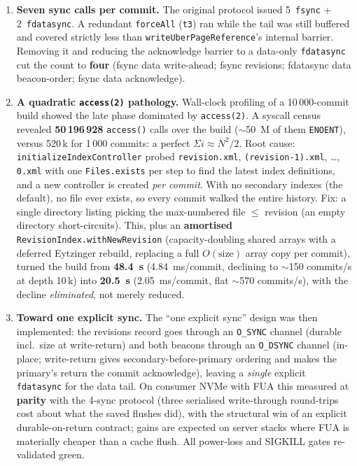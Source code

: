 \documentclass[11pt,a4paper,oneside]{report}
\theoremstyle{sirixthm}
\newcommand{\code}[1]{\texttt{#1}}
\begin{document}
\begin{enumerate}[label=\arabic*.,leftmargin=2em]
\item \textbf{Seven sync calls per commit.} The original protocol issued 5~\code{fsync} {+}
  2~\code{fdatasync}. A redundant \code{forceAll} (\code{t3}) ran while the tail was still
  buffered and covered strictly less than \code{writeUberPageReference}'s internal barrier.
  Removing it and reducing the acknowledge barrier to a data-only \code{fdatasync} cut the
  count to \textbf{four} (fsync data write-ahead; fsync revisions; fdatasync data
  beacon-order; fsync data acknowledge).
\item \textbf{A quadratic \code{access(2)} pathology.} Wall-clock profiling of a
  10\,000-commit build showed the late phase dominated by \code{access(2)}. A syscall census
  revealed \textbf{50\,196\,928} \code{access()} calls over the build ($\sim$50~M of them
  \code{ENOENT}), versus 520\,k for 1\,000 commits: a perfect $\Sigma i \approx N^2/2$.
  Root cause: \code{initializeIndexController} probed \code{revision.xml},
  \code{(revision-1).xml}, \ldots, \code{0.xml} with one \code{Files.exists} per step to find
  the latest index definitions, and a new controller is created \emph{per commit}. With no
  secondary indexes (the default), no file ever exists, so every commit walked the entire
  history. Fix: a single directory listing picking the max-numbered file $\leq$ revision (an
  empty directory short-circuits). This, plus an \textbf{amortised}
  \code{RevisionIndex.withNewRevision} (capacity-doubling shared arrays with a deferred
  Eytzinger rebuild, replacing a full $O(\text{size})$ array copy per commit), turned the
  build from \textbf{48.4~s} (4.84~ms/commit, declining to $\sim$150 commits/s at depth
  10\,k) into \textbf{20.5~s} (2.05~ms/commit, flat $\sim$570 commits/s), with the decline
  \emph{eliminated}, not merely reduced.
\item \textbf{Toward one explicit sync.} The ``one explicit sync'' design was then
  implemented: the revisions record goes through an \code{O\_SYNC} channel (durable incl.\
  size at write-return) and both beacons through an \code{O\_DSYNC} channel (in-place;
  write-return gives secondary-before-primary ordering and makes the primary's return the
  commit acknowledge), leaving a \emph{single} explicit \code{fdatasync} for the data tail.
  On consumer NVMe with FUA this measured at \textbf{parity} with the 4-sync protocol (three
  serialised write-through round-trips cost about what the saved flushes did), with the
  structural win of an explicit durable-on-return contract; gains are expected on server
  stacks where FUA is materially cheaper than a cache flush. All power-loss and SIGKILL gates
  re-validated green.
\end{enumerate}
\end{document}
